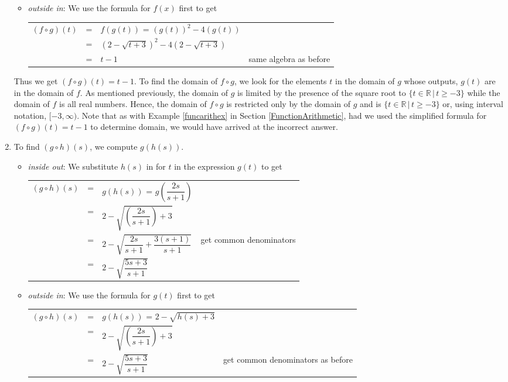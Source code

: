 \begin{ex}
\begin{enumerate}
\begin{itemize}
\item  \textit{outside in}:  We use the formula for $f(x)$ first to get
\begin{longtable}{rclr} $(f \circ g)(t)$ & = & $f(g(t))$ = $\left(g(t)\right)^2 - 4\left(g(t)\right)$& \\ [2pt]
 & = & $\left(2-\sqrt{t+3}\right)^2 - 4\left(2-\sqrt{t+3}\right)$ & \\[2pt] 
 & = & $t-1$ & same algebra as before \\
 \end{longtable}

\end{itemize}

Thus we get $(f \circ g)(t) = t-1$.  To find the domain of $f \circ g$, we look for the elements $t$ in the domain of $g$ whose outputs, $g(t)$ are in the domain of $f$.   As mentioned previously, the domain of $g$ is limited by the presence of the square root to  $\{ t \in \mathbb{R} \, | \, t \geq -3\}$  while the domain of $f$ is all real numbers.  Hence,  the domain of $f \circ g$ is restricted only by the domain of $g$ and is $\{ t \in \mathbb{R} \, | \, t \geq -3\}$ or, using interval notation,  $[-3, \infty)$.  Note that as with Example \ref{funcarithex}  in Section \ref{FunctionArithmetic}, had we used the simplified formula for $(f \circ g)(t) = t-1$  to determine domain, we would have arrived at the incorrect answer.



\item  To find $(g \circ h)(s)$, we compute $g(h(s))$. 

\begin{itemize}

\item  \textit{inside out}: We substitute $h(s)$ in for $t$ in the expression $g(t)$  to get 
\begin{longtable}{rclr} $(g \circ h)(s)$ & = & $g(h(s))$ = $g\left(\dfrac{2s}{s+1}\right)$  & \\ [12pt]
 & = & $2 - \sqrt{\left(\dfrac{2s}{s+1}\right)+3}$ & \\[12pt] 
 & = & $2 - \sqrt{\dfrac{2s}{s+1} + \dfrac{3(s+1)}{s+1}}$ & get common denominators\\ [12pt]
 & = & $2 - \sqrt{\dfrac{5s+3}{s+1}}$ & \\
 \end{longtable}

\item  \textit{outside in}:  We use the formula for $g(t)$ first to get
\begin{longtable}{rclr} $(g \circ h)(s)$ & = & $g(h(s))$ = $2 - \sqrt{h(s)+3}$& \\ [2pt]
  & = & $2 - \sqrt{\left(\dfrac{2s}{s+1}\right)+3}$ & \\[12pt] 
 & = & $2 - \sqrt{\dfrac{5s+3}{s+1}}$ & get common denominators as before\\
 \end{longtable}


\end{itemize}
\end{enumerate}
\end{ex}
